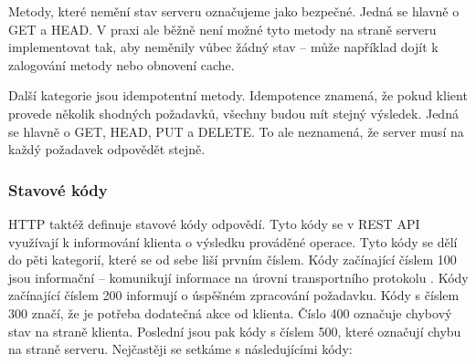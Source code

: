 \documentclass[thesis=M,czech]{FITthesis}[2019/12/23]
\begin{document}
Metody, které nemění stav serveru označujeme jako bezpečné. Jedná se hlavně o GET a HEAD. V praxi ale běžně není možné tyto metody na straně serveru implementovat tak, aby neměnily vůbec žádný stav -- může například dojít k zalogování metody nebo obnovení cache.

Další kategorie jsou idempotentní metody. Idempotence znamená, že pokud klient provede několik shodných požadavků, všechny budou mít stejný výsledek. Jedná se hlavně o GET, HEAD, PUT a DELETE. To ale neznamená, že server musí na každý požadavek odpovědět stejně.


\subsubsection*{Stavové kódy}
HTTP taktéž definuje stavové kódy odpovědí. Tyto kódy se v REST API využívají k informování klienta o výsledku prováděné operace. Tyto kódy se dělí do pěti kategorií, které se od sebe liší prvním číslem. Kódy začínající číslem 100 jsou informační -- komunikují informace na úrovni transportního protokolu \cite{http_codes}. Kódy začínající číslem 200 informují o úspěšném zpracování požadavku. Kódy s číslem 300 značí, že je potřeba dodatečná akce od klienta. Číslo 400 označuje chybový stav na straně klienta. Poslední jsou pak kódy s číslem 500, které označují chybu na straně serveru. Nejčastěji se setkáme s následujícími kódy:
\end{document}
